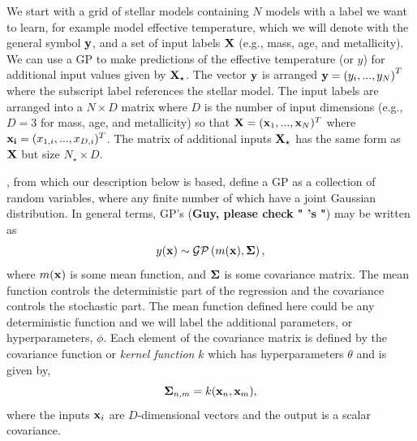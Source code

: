 We start with a grid of stellar models containing $N$ models with a label we want to learn, for example model effective temperature, which we will denote with the general symbol $\bf y$, and a set of input labels $\bf X$ (e.g., mass, age, and metallicity).  We can use a GP to make predictions of the effective temperature (or $y$) for additional input values given by $\bf X_{\star}$.  The vector $\bf y$ is arranged ${\bf y} = \left(y_{i}, ... ,y_{N} \right)^{T}$ where the subscript label references the stellar model.  The input labels are arranged into a $N \times D$ matrix where $D$ is the number of input dimensions (e.g., $D=3$ for mass, age, and metallicity) so that ${\bf X} = ({\bf x}_{1}, ..., {\bf x}_{N})^{T}$ where ${\bf x_{i}} = (x_{1, i}, ..., x_{D, i})^{T}$.  The matrix of additional inputs $\bf X_{\star}$ has the same form as $\bf X$ but size $N_{\star} \times D$.

\citet{williams1996gaussian}, from which our description below is based, define a GP as a collection of random variables, where any finite number of which have a joint Gaussian distribution.  In general terms, GP's ({\bf Guy, please check " 's "}) may be written as
\begin{equation}
y({\bf x}) \sim \mathcal{GP}\left( m({\bf x}), {\bf \Sigma}\right),
\end{equation}
where $m({\bf x})$ is some mean function, and ${\bf \Sigma}$ is some covariance matrix.  The mean function controls the deterministic part of the regression and the covariance controls the stochastic part.  The mean function defined here could be any deterministic function and we will label the additional parameters, or hyperparameters, $\phi$.  Each element of the covariance matrix is defined by the covariance function or {\it kernel function} $k$ which has hyperparameters $\theta$ and is given by,
\begin{equation}
{\bf \Sigma}_{n, m} = k({\bf x}_{n}, {\bf x}_{m}),
\end{equation}
where the inputs ${\bf x}_{i}$ are $D$-dimensional vectors and the output is a scalar covariance.

